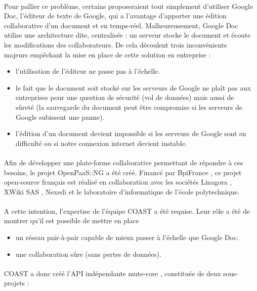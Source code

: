 \documentclass[12pt]{article}
\begin{document}
\paragraph{}
Pour pallier ce problème, certains proposeraient tout simplement d'utiliser Google Doc, l'éditeur de texte de Google, qui a l'avantage d'apporter une édition collaborative d'un document et en temps-réel. Malheureusement, Google Doc utilise une architecture dite, centralisée : un serveur stocke le document et écoute les modifications des collaborateurs. De cela découlent trois inconvénients majeurs empêchant la mise en place de cette solution en entreprise :\\
\begin{itemize}
    \item l'utilisation de l'éditeur ne passe pas à l'échelle.
    \item le fait que le document soit stocké sur les serveurs de Google ne plaît pas aux entreprises pour une question de sécurité (vol de données) mais aussi de sûreté (la sauvegarde du document peut être compromise si les serveurs de Google subissent une panne).
    \item l'édition d'un document devient impossible si les serveurs de Google sont en difficulté ou si notre connexion internet devient instable.
\end{itemize}
\paragraph{}
Afin de développer une plate-forme collaborative permettant de répondre à ces besoins, le projet OpenPaaS::NG \cite{openpaas} a été créé. Financé par BpiFrance \cite{bpi}, ce projet open-source français est réalisé en collaboration avec les sociétés Linagora \cite{linagora}, XWiki SAS \cite{xwiki}, Nexedi \cite{nexedi} et le laboratoire d'informatique de l'école polytechnique.
\paragraph{}
A cette intention, l'expertise de l'équipe COAST a été requise. Leur rôle a été de montrer qu'il est possible de mettre en place
\begin{itemize}
    \item un réseau pair-à-pair capable de mieux passer à l'échelle que Google Doc.
    \item une collaboration sûre (sans pertes de données).
\end{itemize}
\paragraph{}
COAST a donc créé l'API indépendante mute-core \cite{mute-core}, constituée de deux sous-projets :
\end{document}

